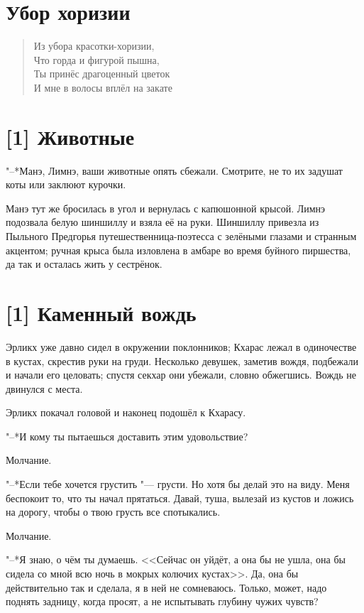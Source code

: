 \section{Убор хоризии}

\begin{verse}
Из убора красотки-хоризии,\\
Что горда и фигурой пышна,\\
Ты принёс драгоценный цветок\\
И мне в волосы вплёл на закате\ldotst
\end{verse}

\section{[1] Животные}

"--*Манэ, Лимнэ, ваши животные опять сбежали.
Смотрите, не то их задушат коты или заклюют курочки.

Манэ тут же бросилась в угол и вернулась с капюшонной крысой.
Лимнэ подозвала белую шиншиллу и взяла её на руки.
Шиншиллу привезла из Пыльного Предгорья путешественница-поэтесса с зелёными глазами и странным акцентом;
ручная крыса была изловлена в амбаре во время буйного пиршества, да так и осталась жить у сестрёнок.

\section{[1] Каменный вождь}

Эрликх уже давно сидел в окружении поклонников;
Кхарас лежал в одиночестве в кустах, скрестив руки на груди.
Несколько девушек, заметив вождя, подбежали и начали его целовать;
спустя секхар они убежали, словно обжегшись.
Вождь не двинулся с места.

Эрликх покачал головой и наконец подошёл к Кхарасу.

"--*И кому ты пытаешься доставить этим удовольствие?

Молчание.

"--*Если тебе хочется грустить "--- грусти.
Но хотя бы делай это на виду.
Меня беспокоит то, что ты начал прятаться.
Давай, туша, вылезай из кустов и ложись на дорогу, чтобы о твою грусть все спотыкались.

Молчание.

"--*Я знаю, о чём ты думаешь.
<<Сейчас он уйдёт, а она бы не ушла, она бы сидела со мной всю ночь в мокрых колючих кустах>>.
Да, она бы действительно так и сделала, я в ней не сомневаюсь.
Только, может, надо поднять задницу, когда просят, а не испытывать глубину чужих чувств?

